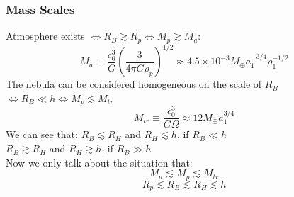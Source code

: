 \documentclass{beamer}
\begin{document}
\begin{frame}
\frametitle{Mass Scales}
Atmosphere exists $\iff R_B \gtrsim R_p \iff M_p \gtrsim M_a$:
\begin{equation}
M_a \equiv \frac{c_0^3}{G}\left( \frac{3}{4 \pi G \rho_p} \right)^{1/2} \approx 4.5 \times 10^{-3} M_{\oplus} a_1^{-3/4} \rho_1^{-1/2}
\end{equation}
The nebula can be considered homogeneous on the scale of $R_B$ \\
$\iff R_B \ll h \iff M_p \lesssim M_{tr}$
\begin{equation}
M_{tr} \equiv \frac{c_0^3}{G \Omega} \approx 12 M_{\oplus} a_1^{3/4}
\end{equation}
We can see that: $R_B \lesssim R_H$ and $R_H \lesssim h$, if $R_B \ll h$ \\
$R_B \gtrsim R_H$ and $R_H \gtrsim h$, if $R_B \gg h$ \\
Now we only talk about the situation that:
\begin{equation}
M_a \lesssim M_p \lesssim M_{tr}
\end{equation}
\begin{equation}
R_p \lesssim R_B \lesssim R_H \lesssim h
\end{equation}
\end{frame}
\end{document}
